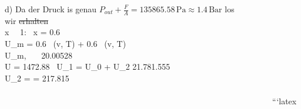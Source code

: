 d) Da der Druck is genau \( P_{out} + \frac{F}{A} = 135865.58 \, \text{Pa} \approx 1.4 \, \text{Bar} \) los \\
wir \st{erhalten} \,  \,  \,  \,  \,  \\

\Rightarrow x \cdot {} \,  \, 1: \, x = 0.6 \\

\Rightarrow U_m = 0.6 \cdot {} \, (v, T) + 0.6 \cdot {} \, (v, T)  \,  \Rightarrow \\

\Rightarrow U_{m, \, } \,  \, 20.00528 \,  \\

\st{\Rightarrow} \Rightarrow \Delta U = 1472.88 \,  \Rightarrow U_1 = U_0 + U_2 \st{\Rightarrow} 21.781.555 \\

\Rightarrow U_2 =  = 217.815 \\

 \,  \,  \,  \,  \,  \\

\st{} \, \st{} \, \st{} \, \st{} \, \st{} \, \st{} \, \st{} \, \st{} \, \st{} \, \st{} \, \st{} \, \st{} \, \st{} \, \st{} \, \st{} \, \st{} \, \st{} \, \st{} \, \st{} \, \st{} \, \st{} \, \st{} \, \st{} \, \st{} \, \st{} \, \st{} \, \st{} \, \st{} \, \st{} \, \st{} \, \st{} \, \st{} \, \st{} \, \st{} \, \st{} \, \st{} \, \st{} \, \st{} \, \st{} \, \st{} \, \st{} \, \st{} \, \st{} \, \st{} \, \st{} \, \st{} \, \st{} \, \st{} \, \st{} \, \st{} \, \st{} \, \st{} \, \st{} \, \st{} \, \st{} \, \st{} \, \st{} \, \st{} \, \st{} \, \st{} \, \st{} \, \st{} \, \st{} \, \st{} \, \st{} \, \st{}```latex